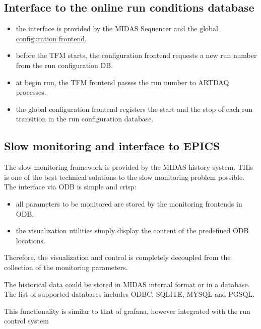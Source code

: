 \subsection{Interface to the online run conditions database} 

\begin{itemize}
\item
  the interface is provided by the MIDAS Sequencer and 
  \href{https://github.com/pavel1murat/frontends/blob/main/conf/mu2e_config_fe.py}
  {\blue the global configuration frontend}.
\item
  before the TFM starts, the configuration frontend requests a new run 
  number from the run configuration DB.
\item
  at begin run, the TFM frontend passes the run number to ARTDAQ processes.
\item
  the global configuration frontend registers the start and the stop of each
  run transition in the run configuration database.
\end{itemize}


\subsection{Slow monitoring and interface to EPICS}

The slow monitoring framework is provided by the MIDAS history system.
THis is one of the best technical solutions to the slow monitoring problem possible.
The interface via ODB is simple and crisp:
\begin{itemize}
\item
  all parameters to be monitored are stored by the monitoring frontends in ODB.
\item
  the visualization utilities simply display the content of the predefined ODB locations.
\end{itemize}

Therefore, the visualization and control is completely decoupled from the collection of the
monitoring parameters.

The historical data could be stored in  MIDAS internal format or in a database.
The list of supported databases includes ODBC, SQLITE, MYSQL and PGSQL.

This functionality is similar to that of grafana, however integrated with the
run control system


